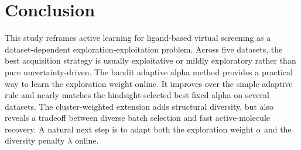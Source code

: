 \documentclass[10pt]{article}
\begin{document}
\section{Conclusion}

This study reframes active learning for ligand-based virtual screening as a dataset-dependent exploration-exploitation problem. Across five datasets, the best acquisition strategy is usually exploitative or mildly exploratory rather than pure uncertainty-driven. The bandit adaptive alpha method provides a practical way to learn the exploration weight online. It improves over the simple adaptive rule and nearly matches the hindsight-selected best fixed alpha on several datasets. The cluster-weighted extension adds structural diversity, but also reveals a tradeoff between diverse batch selection and fast active-molecule recovery. A natural next step is to adapt both the exploration weight $\alpha$ and the diversity penalty $\lambda$ online.
\end{document}
